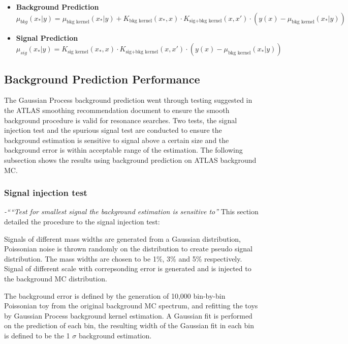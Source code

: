 \begin{itemize}
\begin{itemize}
    \item \textbf{Background Prediction}
    \begin{equation}
        \mu_{bkg}(x_{*}|y) = \mu_{\textrm{bkg kernel}}(x_{*}|y)+K_{\textrm{bkg kernel}}(x_{*}, x) \cdot K_{\textrm{sig+bkg kernel}}(x,x') \cdot( y(x)-\mu_{\textrm{bkg kernel}}(x_{*}|y) )
    \end{equation}


    \item \textbf{Signal Prediction}
    \begin{equation}
        \mu_{sig}(x_{*}|y) = K_{\textrm{sig kernel}}(x_{*}, x)\cdot K_{\textrm{sig+bkg kernel}}(x,x') \cdot ( y(x)-\mu_{\textrm{bkg kernel}}(x_{*}|y) )
    \end{equation}

\end{itemize}


\subsection{Background Prediction Performance}
The Gaussian Process background prediction went through testing suggested in the ATLAS smoothing recommendation document to ensure the smooth background procedure is valid for resonance searches. Two tests, the signal injection test and the spurious signal test are conducted to ensure the background estimation is sensitive to signal above a certain size and the background error is within acceptable range of the estimation. The following subsection shows the results using background prediction on ATLAS background MC.  

\subsubsection{Signal injection test} 
\textit{-``“Test for smallest signal the background estimation is sensitive to”}
This section detailed the procedure to the signal injection test: 

Signals of different mass widths are generated from a Gaussian distribution, Poissonian noise is thrown randomly on the distribution to create pseudo signal distribution. The mass widths are chosen to be 1\%, 3\% and 5\% respectively. Signal of different scale with correpsonding error is generated and is injected to the background MC distribution.

The background error is defined by the generation of 10,000 bin-by-bin Poissonian toy from the original background MC spectrum, and refitting the toys by Gaussian Process background kernel estimation. A Gaussian fit is performed on the prediction of each bin, the resulting width of the Gaussian fit in each bin is defined to be the 1 $\sigma$ background estimation. 


\end{itemize}

